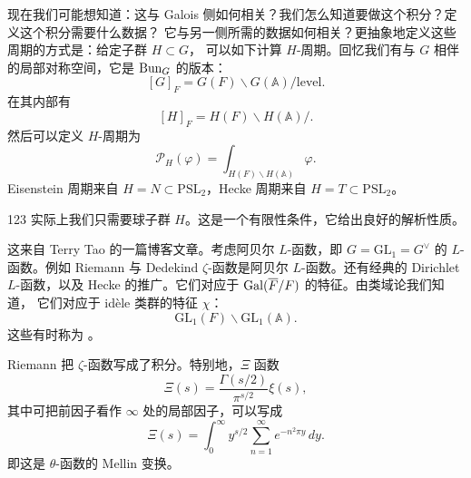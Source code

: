 现在我们可能想知道：这与 Galois 侧如何相关？我们怎么知道要做这个积分？定义这个积分需要什么数据？
它与另一侧所需的数据如何相关？更抽象地定义这些周期的方式是：给定子群 $H\subset G$，
可以如下计算 $H$-周期。回忆我们有与 $G$ 相伴的局部对称空间，它是 $\mathrm{Bun}_G$ 的版本：
\begin{equation}\tag{17.108}\label{eq:17.108}
[G]_F=G(F)\backslash G(\mathbb A)/\text{level}.
\end{equation}
在其内部有
\begin{equation}\tag{17.109}\label{eq:17.109}
[H]_F=H(F)\backslash H(\mathbb A)/.
\end{equation}
然后可以定义 $H$-周期为
\begin{equation}\tag{17.110}\label{eq:17.110}
\mathcal{P}_H(\varphi)=\int_{H(F)\backslash H(\mathbb A)}\varphi.
\end{equation}
Eisenstein 周期来自 $H=N\subset\mathrm{PSL}_2$，Hecke 周期来自 $H=T\subset\mathrm{PSL}_2$。

\begin{srcrem}{123}
实际上我们只需要球子群 $H$。这是一个有限性条件，它给出良好的解析性质。
\end{srcrem}


这来自 Terry Tao 的一篇博客文章。考虑阿贝尔 $L$-函数，即 $G=\mathrm{GL}_1=G^{\vee}$ 的
$L$-函数。例如 Riemann 与 Dedekind $\zeta$-函数是阿贝尔 $L$-函数。还有经典的 Dirichlet
$L$-函数，以及 Hecke 的推广。它们对应于 $\mathrm{Gal}(\overline F/F)$ 的特征。由类域论我们知道，
它们对应于 idèle 类群的特征 $\chi$：
\begin{equation}\tag{17.111}\label{eq:17.111}
\mathrm{GL}_1(F)\backslash\mathrm{GL}_1(\mathbb A).
\end{equation}
这些有时称为 。

Riemann 把 $\zeta$-函数写成了积分。特别地，$\Xi$ 函数
\begin{equation}\tag{17.112}\label{eq:17.112}
\Xi(s)=\frac{\Gamma(s/2)}{\pi^{s/2}}\xi(s),
\end{equation}
其中可把前因子看作 $\infty$ 处的局部因子，可以写成
\begin{equation}\tag{17.113}\label{eq:17.113}
\Xi(s)=\int_0^{\infty}y^{s/2}\sum_{n=1}^{\infty}e^{-n^2\pi y}\,dy.
\end{equation}
即这是 $\theta$-函数的 Mellin 变换。

